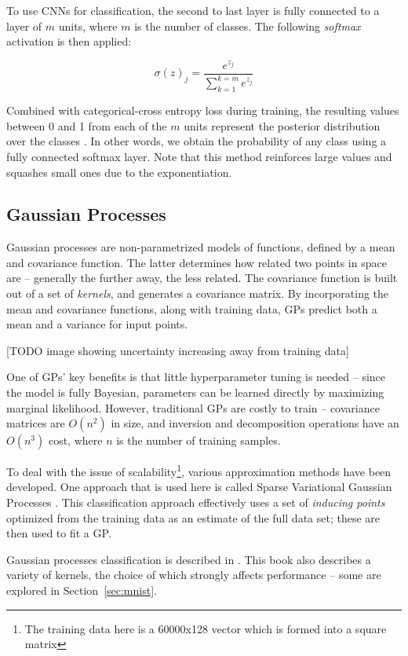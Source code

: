\documentclass{article}
\begin{document}
To use CNNs for classification, the second to last layer is fully connected to a layer of $m$ units, where $m$ is the number of classes. The following \textit{softmax} activation is then applied:

\[ \sigma(z)_j = \frac{e^{z_j}}{\sum_{k=1}^{k=m}e^{z_j}} \]

Combined with categorical-cross entropy loss during training, the resulting values between 0 and 1 from each of the $m$ units represent the posterior distribution over the classes \cite{bridle1990probabilistic}. In other words, we obtain the probability of any class using a fully connected softmax layer. Note that this method reinforces large values and squashes small ones due to the exponentiation.

\subsection{Gaussian Processes}
\label{sec:background:gp}
Gaussian processes are non-parametrized models of functions, defined by a mean and covariance function. The latter determines how related two points in space are -- generally the further away, the less related. The covariance function is built out of a set of \textit{kernels}, and generates a covariance matrix. By incorporating the mean and covariance functions, along with training data, GPs predict both a mean and a variance for input points.

[TODO image showing uncertainty increasing away from training data]

One of GPs' key benefits is that little hyperparameter tuning is needed -- since the model is fully Bayesian, parameters can be learned directly by maximizing marginal likelihood. However, traditional GPs are costly to train -- covariance matrices are $O(n^2)$ in size, and inversion and decomposition operations have an $O(n^3)$ cost, where $n$ is the number of training samples.

To deal with the issue of scalability\footnote{The training data here is a 60000x128 vector which is formed into a square matrix}, various approximation methods have been developed. One approach that is used here is called Sparse Variational Gaussian Processes \cite{hensman2015scalable}. This classification approach effectively uses a set of \textit{inducing points} optimized from the training data as an estimate of the full data set; these are then used to fit a GP.

Gaussian processes classification is described in \citet*{rasmussen2004gaussian}. This book also describes a variety of kernels, the choice of which strongly affects performance -- some are explored in Section~\ref{sec:mnist}. 
\end{document}
